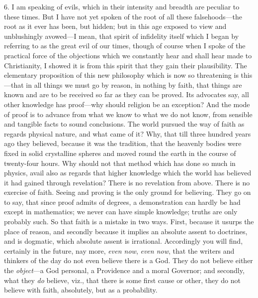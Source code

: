 6. I am speaking of evils, which in their
intensity and breadth are peculiar to these times. But I have not yet
spoken of the root of all these falsehoods—the root as it ever has
been, but hidden; but in this age exposed to view and unblushingly
avowed—I mean, that spirit of infidelity itself which I began by
referring to as the great evil of our times, though of course when I
spoke of the practical force of the objections which we constantly
hear and shall hear made to Christianity, I showed it is from this
spirit that they gain their plausibility. The elementary proposition
of this new philosophy which is now so threatening is this—that in
all things we must go by reason, in nothing by faith, that things are
known and are to be received so far as they can be proved. Its
advocates say, all other knowledge has proof—why should religion be
an exception? And the mode of proof is to advance from what we know to
what we do not know, from sensible and tangible facts to sound
conclusions. The world pursued the way of faith as regards physical
nature, and what came of it? Why, that till three hundred years
ago they believed, because it was the tradition, that the heavenly
bodies were fixed in solid crystalline spheres and moved round the
earth in the course of twenty-four hours. Why should not that method
which has done so much in physics, avail also as regards that higher
knowledge which the world has believed it had gained through
revelation? There is no revelation from above. There is no exercise of
faith. Seeing and proving is the only ground for believing. They go on
to say, that since proof admits of degrees, a demonstration can hardly
be had except in mathematics; we never can have simple knowledge;
truths are only probably such. So that faith is a mistake in two ways.
First, because it usurps the place of reason, and secondly because it
implies an absolute assent to doctrines, and is dogmatic, which
absolute assent is irrational. Accordingly you will find, certainly in
the future, nay more, \emph{even now}, \emph{even now}, that the
writers and thinkers of the day do not even believe there is a God.
They do not believe either the \emph{object}—a God personal, a
Providence and a moral Governor; and secondly, what they \emph{do}
believe, viz., that there is some first cause or other, they do not
believe with faith, absolutely, but as a probability.


